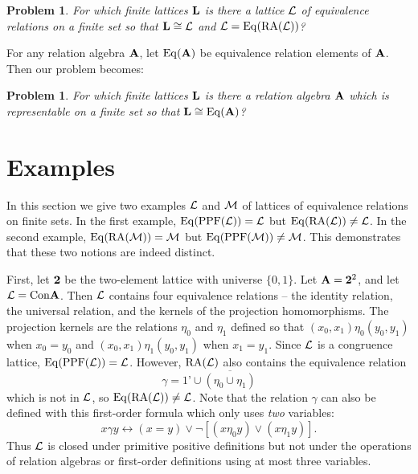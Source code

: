 \documentclass[12pt]{au}
\newtheorem{prb}[thm]{Problem}
\begin{document}
\begin{prb} \label{RAP}
For which finite lattices ${{\mathbf{\uppercase{l}}}}$ is there a lattice ${{\mathcal{\uppercase {l}}}}$ of equivalence relations on a finite set so that ${{\mathbf{\uppercase{l}}}} \cong {{\mathcal{\uppercase {l}}}}$ and ${{\mathcal{\uppercase {l}}}} =  {{\rm Eq}}({{\rm RA}}({{\mathcal{\uppercase {L}}}}))$?
\end{prb}

For any relation algebra ${{\mathbf{\uppercase{a}}}}$, let ${{\rm Eq}}({{\mathbf{\uppercase{a}}}})$ be equivalence relation elements of ${{\mathbf{\uppercase{a}}}}$.  Then our problem becomes:

\begin{prb}
For which finite lattices ${{\mathbf{\uppercase{l}}}}$ is there a relation algebra ${{\mathbf{\uppercase{a}}}}$ which is representable on a finite set so that ${{\mathbf{\uppercase{l}}}} \cong {{\rm Eq}}({{\mathbf{\uppercase{a}}}})$?
\end{prb}
\section{Examples}

In this section we give two examples ${{\mathcal{\uppercase {L}}}}$ and ${{\mathcal{\uppercase {M}}}}$ of lattices of equivalence relations on finite sets.
In the first example, ${{\rm Eq}}({{\rm PPF}}({{\mathcal{\uppercase {L}}}})) = {{\mathcal{\uppercase {L}}}}$ but ${{\rm Eq}}({{\rm RA}}({{\mathcal{\uppercase {L}}}})) \neq {{\mathcal{\uppercase {L}}}}$.
In the second example,  ${{\rm Eq}}({{\rm RA}}({{\mathcal{\uppercase {M}}}})) = {{\mathcal{\uppercase {M}}}}$ but ${{\rm Eq}}({{\rm PPF}}({{\mathcal{\uppercase {M}}}})) \neq {{\mathcal{\uppercase {M}}}}$.
This demonstrates that these two notions are indeed distinct.

First, let ${{\mathbf{\uppercase{2}}}}$ be the two-element lattice with universe $\{0,1\}$.  Let ${{\mathbf{\uppercase{a}}}} = {{\mathbf{\uppercase{2}}}}^2$, and let ${{\mathcal{\uppercase {L}}}}={{\rm Con}} {{\mathbf{\uppercase{a}}}}$.  Then ${{\mathcal{\uppercase {L}}}}$ contains four
equivalence relations -- the identity relation, the universal relation,
and the kernels of the projection homomorphisms.  The projection kernels
are the relations $\eta_0$ and $\eta_1$ defined so that $(x_0,x_1) \eta_0
(y_0,y_1)$ when $x_0=y_0$ and  $(x_0,x_1) \eta_1
(y_0,y_1)$ when $x_1=y_1$.  Since ${{\mathcal{\uppercase {L}}}}$ is a
congruence lattice, ${{\rm Eq}}({{\rm PPF}}({{\mathcal{\uppercase {L}}}})) = {{\mathcal{\uppercase {L}}}}$.
However, ${{\rm RA}}({{\mathcal{\uppercase {L}}}})$ also contains the equivalence relation
$$\gamma = {{1\textrm{'}}} \cup \overline{(\eta_0 \cup \eta_1)}$$ which is not in ${{\mathcal{\uppercase {L}}}}$,
so   ${{\rm Eq}}({{\rm RA}}({{\mathcal{\uppercase {L}}}})) \neq {{\mathcal{\uppercase {L}}}}$.
Note that the relation $\gamma$ can also be defined with this  first-order formula which only uses {\it two} variables:
$$x \gamma y \leftrightarrow (x=y) \vee \neg[(x\eta_0 y) \vee(x \eta_1 y)].$$
Thus ${{\mathcal{\uppercase {L}}}}$ is closed under
primitive positive definitions but not under the operations of relation
algebras or first-order definitions using at most three variables.
\end{document}
